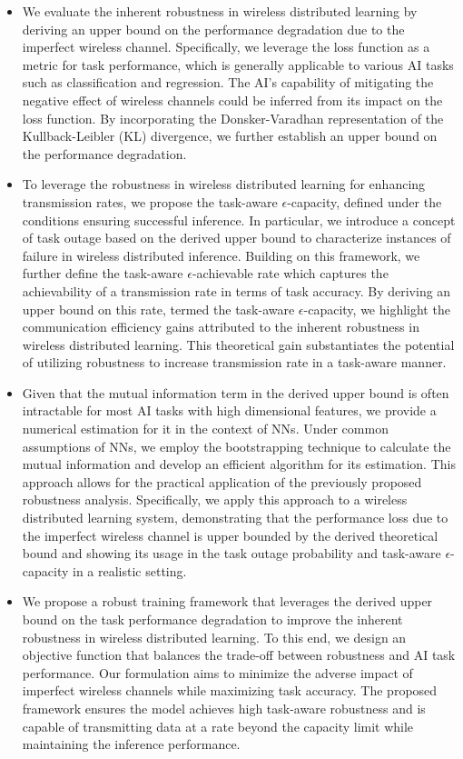 \documentclass[lettersize,journal]{IEEEtran}
\theoremstyle{definition}
\theoremstyle{plain}
\begin{document}
\begin{itemize}
    \item We evaluate the inherent robustness in wireless distributed learning by deriving an upper bound on the performance degradation due to the imperfect wireless channel. Specifically, we leverage the loss function as a metric for task performance, which is generally applicable to various AI tasks such as classification and regression. The AI's capability of mitigating the negative effect of wireless channels could be inferred from its impact on the loss function. By incorporating the Donsker-Varadhan representation of the Kullback-Leibler (KL) divergence, we further establish an upper bound on the performance degradation.
    \item To leverage the robustness in wireless distributed learning for enhancing transmission rates, we propose the task-aware $\epsilon$-capacity, defined under the conditions ensuring successful inference. In particular, we introduce a concept of task outage based on the derived upper bound to characterize instances of failure in wireless distributed inference. Building on this framework, we further define the task-aware $\epsilon$-achievable rate which captures the achievability of a transmission rate in terms of task accuracy. By deriving an upper bound on this rate, termed the task-aware $\epsilon$-capacity, we highlight the communication efficiency gains attributed to the inherent robustness in wireless distributed learning. This theoretical gain substantiates the potential of utilizing robustness to increase transmission rate in a task-aware manner.
    \item Given that the mutual information term in the derived upper bound is often intractable for most AI tasks with high dimensional features, we provide a numerical estimation for it in the context of NNs. Under common assumptions of NNs, we employ the bootstrapping technique to calculate the mutual information and develop an efficient algorithm for its estimation. This approach allows for the practical application of the previously proposed robustness analysis. Specifically, we apply this approach to a wireless distributed learning system, demonstrating that the performance loss due to the imperfect wireless channel is upper bounded by the derived theoretical bound and showing its usage in the task outage probability and task-aware $\epsilon$-capacity in a realistic setting.
    \item We propose a robust training framework that leverages the derived upper bound on the task performance degradation to improve the inherent robustness in wireless distributed learning. To this end, we design an objective function that balances the trade-off between robustness and AI task performance. Our formulation aims to minimize the adverse impact of imperfect wireless channels while maximizing task accuracy. The proposed framework ensures the model achieves high task-aware robustness and is capable of transmitting data at a rate beyond the capacity limit while maintaining the inference performance.
\end{itemize}
\end{document}
